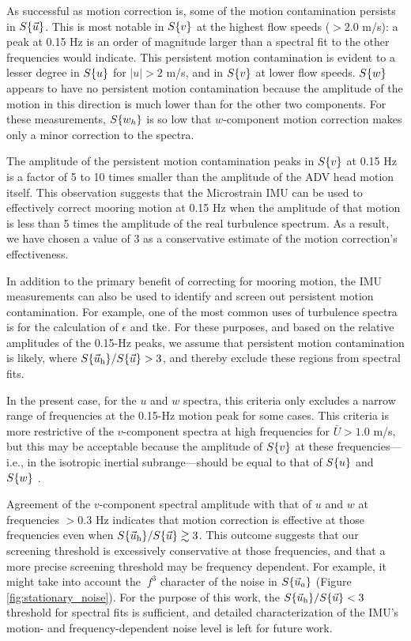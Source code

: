 As successful as motion correction is, some of the motion contamination persists in $S\{\vec{u}\}$. This is most notable in $S\{v\}$ at the highest flow speeds ($>2.0$ m/s): a peak at 0.15 Hz is an order of magnitude larger than a spectral fit to the other frequencies would indicate. This persistent motion contamination is evident to a lesser degree in $S\{u\}$ for $|u|>2$ m/s, and in $S\{v\}$ at lower flow speeds.  $S\{w\}$ appears to have no persistent motion contamination because the amplitude of the motion in this direction is much lower than for the other two components. For these measurements, $S\{w_h\}$ is so low that $w$-component motion correction makes only a minor correction to the spectra.

The amplitude of the persistent motion contamination peaks in $S\{v\}$ at 0.15 Hz is a factor of 5 to 10 times smaller than the amplitude of the ADV head motion itself. This observation suggests that the Microstrain IMU can be used to effectively correct mooring motion at 0.15 Hz when the amplitude of that motion is less than 5 times the amplitude of the real turbulence spectrum. As a result, we have chosen a value of 3 as a conservative estimate of the motion correction's effectiveness.

In addition to the primary benefit of correcting for mooring motion, the IMU measurements can also be used to identify and screen out persistent motion contamination. For example, one of the most common uses of turbulence spectra is for the calculation of $\epsilon$ and $\mathrm{tke}$. For these purposes, and based on the relative amplitudes of the 0.15-Hz peaks, we assume that persistent motion contamination is likely, where $S\{\vec{u}_\mathrm{h}\}/S\{\vec{u}\} > 3$, and thereby exclude these regions from spectral fits.

In the present case, for the $u$ and $w$ spectra, this criteria only excludes a narrow range of frequencies at the 0.15-Hz motion peak for some cases. This criteria is more restrictive of the $v$-component spectra at high frequencies for $\bar U > 1.0$ m/s, but this may be acceptable because the amplitude of $S\{v\}$ at these frequencies---i.e., in the isotropic inertial subrange---should be equal to that of $S\{u\}$ and $S\{w\}$ \cite[]{Kolmogorov1941c}.

Agreement of the $v$-component spectral amplitude with that of $u$ and $w$ at frequencies $>0.3$ Hz indicates that motion correction is effective at those frequencies even when $S\{\vec{u}_\mathrm{h}\}/S\{\vec{u}\} \gtrsim 3$. This outcome suggests that our screening threshold is excessively conservative at those frequencies, and that a more precise screening threshold may be frequency dependent. For example, it might take into account the $~f^3$ character of the noise in $S\{\vec{u}_a\}$ (Figure \ref{fig:stationary_noise}). For the purpose of this work, the $S\{\vec{u}_\mathrm{h}\}/S\{\vec{u}\} < 3$ threshold for spectral fits is sufficient, and detailed characterization of the IMU's motion- and frequency-dependent noise level is left for future work.


